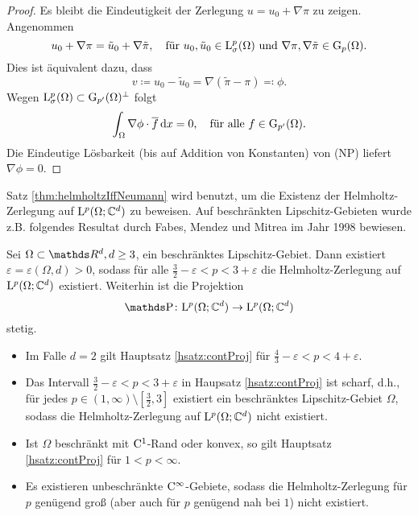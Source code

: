 \begin{proof}
  Es bleibt die Eindeutigkeit der Zerlegung $u = u_0 + \nabla \pi$ zu zeigen.
  Angenommen
  $$
  u_0 + \nabla \pi = \tilde u_0 + \nabla \tilde \pi, \quad\text{für }
  u_0,\tilde u_0 \in \mathrm{L}_\sigma^p(\Omega) \text{ und } \nabla \pi, \nabla \tilde \pi \in \mathrm{G}_p(\Omega).
  $$
  Dies ist äquivalent dazu, dass 
  $$
  v \coloneqq u_0 - \tilde u_0 = \nabla( \tilde \pi - \pi) \eqqcolon \phi.
  $$
  Wegen $\mathrm{L}_\sigma^p(\Omega) \subset \mathrm{G}_{p'}(\Omega)^\perp$ folgt
  $$
  \int_\Omega \nabla \phi \cdot \overline f \, {\operatorname{d}\!{x}} = 0, \quad\text{für alle } f \in \mathrm{G}_{p'}(\Omega).
  $$
  Die Eindeutige Lösbarkeit (bis auf Addition von Konstanten) von (NP) liefert $\nabla\phi = 0$.
\end{proof}

Satz \ref{thm:helmholtzIffNeumann} wird benutzt, um die Existenz der Helmholtz-Zerlegung auf $\mathrm{L}^p(\Omega; \mathbb{C}^d)$ zu beweisen.
Auf beschränkten Lipschitz-Gebieten wurde z.B. folgendes Resultat durch Fabes, Mendez und Mitrea im Jahr 1998 \cite{fabes} bewiesen.

\begin{hsatz}
  \label{hsatz:contProj}
  Sei $\Omega \subset \R^d, d \geq 3$, ein beschränktes Lipschitz-Gebiet.
  Dann existiert $\varepsilon = \varepsilon(\Omega, d) > 0$, sodass für alle $\frac{3}{2} - \varepsilon < p < 3 + \varepsilon$ die Helmholtz-Zerlegung auf $\mathrm{L}^p(\Omega; \mathbb{C}^d)$ existiert.
  Weiterhin ist die Projektion
  $$
  \PP \colon \Ell^p(\Omega; \C^d) \to \Ell^p(\Omega; \C^d)
  $$
  stetig.
\end{hsatz}

\begin{rem}
  \begin{itemize}
    \item Im Falle $d = 2$ gilt Hauptsatz \ref{hsatz:contProj} für $\frac{4}{3} - \varepsilon < p < 4 + \varepsilon$.
    \item Das Intervall $\frac{3}{2} - \varepsilon < p < 3 + \varepsilon$ in Haupsatz \ref{hsatz:contProj} ist scharf, d.h., für jedes $p \in (1,\infty) \setminus [\frac{3}{2}, 3]$ existiert ein beschränktes Lipschitz-Gebiet $\Omega$, sodass die Helmholtz-Zerlegung auf $\mathrm{L}^p(\Omega; \mathbb{C}^d)$ nicht existiert.
    \item Ist $\Omega$ beschränkt mit $\mathrm{C}^1$-Rand oder konvex, so gilt Hauptsatz \ref{hsatz:contProj} für $1 < p < \infty$.
    \item Es existieren unbeschränkte $\mathrm{C}^\infty$-Gebiete, sodass die Helmholtz-Zerlegung für $p$ genügend groß (aber auch für $p$ genügend nah bei $1$) nicht existiert.
  \end{itemize}
\end{rem}

